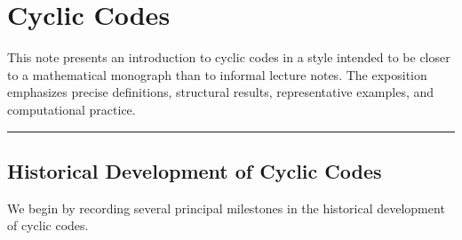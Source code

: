 \documentclass[
]{article}
\author{}
\date{}
\begin{document}
{
\setcounter{tocdepth}{3}
\tableofcontents
}
\section{Cyclic Codes}\label{cyclic-codes}

This note presents an introduction to cyclic codes in a style intended to be closer to a mathematical monograph than to informal lecture notes. The exposition emphasizes precise definitions, structural results, representative examples, and computational practice.

\begin{center}\rule{0.5\linewidth}{0.5pt}\end{center}

\subsection{Historical Development of Cyclic Codes}\label{historical-development-of-cyclic-codes}

We begin by recording several principal milestones in the historical development of cyclic codes.
\end{document}
